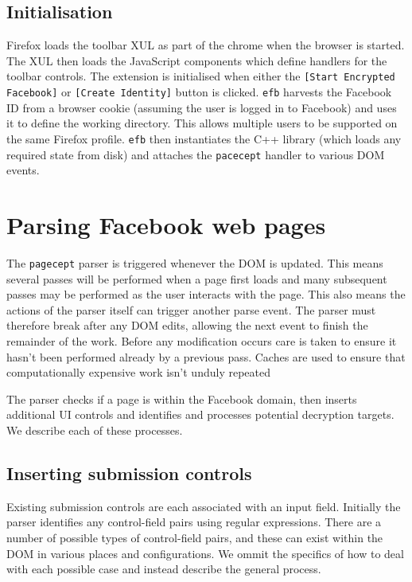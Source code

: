     
\FloatBarrier    
\subsection{Initialisation}

Firefox loads the toolbar XUL as part of the chrome when the browser is started. The XUL then loads the JavaScript components which define handlers for the toolbar controls. The extension is initialised when either the {\tt [Start Encrypted Facebook]} or {\tt [Create Identity]} button is clicked. {\tt efb} harvests the Facebook ID from a browser cookie (assuming the user is logged in to Facebook) and uses it to define the working directory. This allows multiple users to be supported on the same Firefox profile. {\tt efb} then instantiates the C++ library (which loads any required state from disk) and attaches the {\tt pacecept} handler to various DOM events.


\FloatBarrier
\section{Parsing Facebook web pages}

The {\tt pagecept} parser is triggered whenever the DOM is updated. This means several passes will be performed when a page first loads and many subsequent passes may be performed as the user interacts with the page. This also means the actions of the parser itself can trigger another parse event. The parser must therefore break after any DOM edits, allowing the next event to finish the remainder of the work. Before any modification occurs care is taken to ensure it hasn't been performed already by a previous pass. Caches are used to ensure that computationally expensive work isn't unduly repeated

The parser checks if a page is within the Facebook domain, then inserts additional UI controls and identifies and processes potential decryption targets. We describe each of these processes.

\subsection{Inserting submission controls}
\label{ssec:insert}

Existing submission controls are each associated with an input field. Initially the parser identifies any control-field pairs using regular expressions. There are a number of possible types of control-field pairs, and these can exist within the DOM in various places and configurations. We ommit the specifics of how to deal with each possible case and instead describe the general process.

